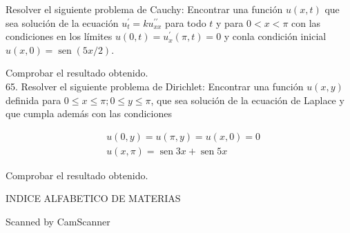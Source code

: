 \documentclass[10pt]{article}
\theoremstyle{plain}
\theoremstyle{definition}
\theoremstyle{remark}
\begin{document}
Resolver el siguiente problema de Cauchy: Encontrar una función $u(x, t)$ que sea solución de la ecuación $u_{t}^{\prime}=k u_{x x}^{\prime \prime}$ para todo $t$ y para $0<x<\pi$ con las condiciones en los límites $u(0, t)=u_{x}^{\prime}(\pi, t)=0$ y conla condición inicial $u(x, 0)=\operatorname{sen}(5 x / 2)$.

Comprobar el resultado obtenido.\\
65. Resolver el siguiente problema de Dirichlet: Encontrar una función $u(x, y)$ definida para $0 \leqslant x \leqslant \pi ; 0 \leqslant y \leqslant \pi$, que sea solución de la ecuación de Laplace y que cumpla además con las condiciones

$$
\begin{aligned}
& u(0, y)=u(\pi, y)=u(x, 0)=0 \\
& u(x, \pi)=\operatorname{sen} 3 x+\operatorname{sen} 5 x
\end{aligned}
$$

Comprobar el resultado obtenido.

INDICE ALFABETICO DE MATERIAS

Scanned by CamScanner
\end{document}
